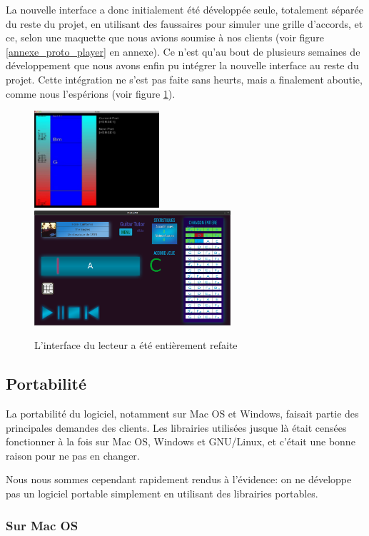 La nouvelle interface a donc initialement été développée seule, totalement séparée du reste du projet, en utilisant des faussaires pour simuler une grille d'accords, et ce, selon une maquette que nous avions soumise à nos clients (voir figure \ref{annexe_proto_player} en annexe). Ce n'est qu'au bout de plusieurs semaines de développement que nous avons enfin pu intégrer la nouvelle interface au reste du projet. Cette intégration ne s'est pas faite sans heurts, mais a finalement aboutie, comme nous l'espérions (voir figure \ref{interface_player}).

\begin{figure}[H]
\begin{center}
\includegraphics[width=175px]{ancien_player.png}
\includegraphics[width=275px]{interface_player.png}
\caption{L'interface du lecteur a été entièrement refaite}
\label{interface_player}
\end{center}
\end{figure}

\subsection{Portabilité}

La portabilité du logiciel, notamment sur Mac OS et Windows, faisait partie des principales demandes des clients. Les librairies utilisées jusque là était censées fonctionner à la fois sur Mac OS, Windows et GNU/Linux, et c'était une bonne raison pour ne pas en changer.

Nous nous sommes cependant rapidement rendus à l'évidence: on ne développe pas un logiciel portable simplement en utilisant des librairies portables.

\subsubsection*{Sur Mac OS}


